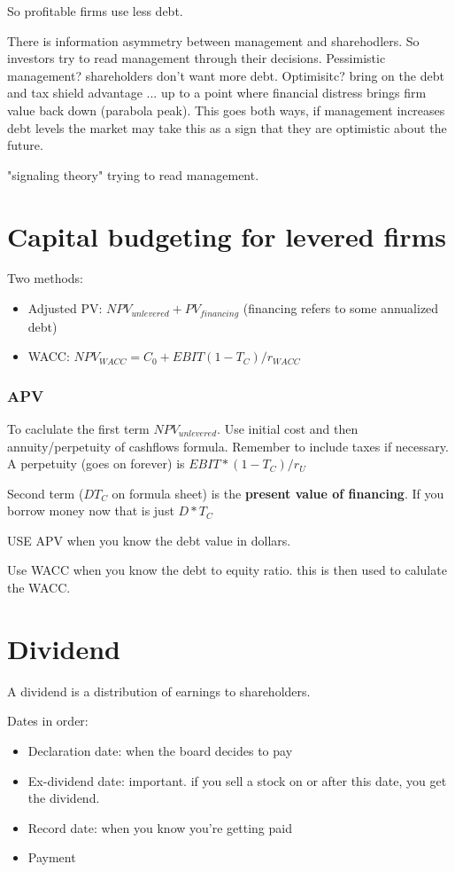 \documentclass{article}
\begin{document}
So profitable firms use less debt. 

There is information asymmetry between management and sharehodlers. So investors try to read management through their decisions.
Pessimistic management? shareholders don't want more debt. 
Optimisitc? bring on the debt and tax shield advantage ... up to a point where financial distress brings firm value back down (parabola peak). This goes both ways, if management increases debt levels the market may take this as a sign that they are optimistic about the future. 

"signaling theory" trying to read management. 

\section{Capital budgeting for levered firms}
Two methods:
\begin{itemize}
\item Adjusted PV: $NPV_{unlevered} + PV_{financing}$ (financing refers to some annualized debt)
\item WACC: $NPV_{WACC} = C_0 + EBIT(1-T_C)/r_{WACC}$
\end{itemize}

\subsubsection{APV}
To caclulate the first term $NPV_{unlevered}$. Use initial cost and then annuity/perpetuity of cashflows formula. Remember to include taxes if necessary.  A perpetuity (goes on forever) is $EBIT*(1-T_C)/r_U$

Second term ($DT_C$ on formula sheet) is the \textbf{present value of financing}. If you borrow money now that is just $D * T_C$ 

USE APV when you know the debt value in dollars. 

Use WACC when you know the debt to equity ratio. this is then used to calulate the WACC. 

\section{Dividend}
A dividend is a distribution of earnings to shareholders. 

Dates in order:
\begin{itemize}
\item Declaration date: when the board decides to pay
\item Ex-dividend date: important. if you sell a stock on or after this date, you get the dividend.
\item Record date: when you know you're getting paid
\item Payment
\end{itemize}
\end{document}
